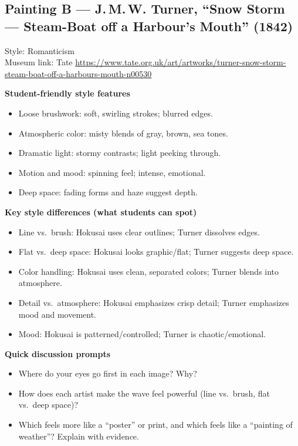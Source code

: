 \documentclass[12pt]{article}
\begin{document}
\subsection*{Painting B — J.\,M.\,W. Turner, ``Snow Storm — Steam-Boat off a Harbour’s Mouth'' (1842)}
Style: Romanticism \\
Museum link: Tate \url{https://www.tate.org.uk/art/artworks/turner-snow-storm-steam-boat-off-a-harbours-mouth-n00530}

\textbf{Student-friendly style features}
\begin{itemize}
  \item Loose brushwork: soft, swirling strokes; blurred edges.
  \item Atmospheric color: misty blends of gray, brown, sea tones.
  \item Dramatic light: stormy contrasts; light peeking through.
  \item Motion and mood: spinning feel; intense, emotional.
  \item Deep space: fading forms and haze suggest depth.
\end{itemize}

\textbf{Key style differences (what students can spot)}
\begin{itemize}
  \item Line vs.\ brush: Hokusai uses clear outlines; Turner dissolves edges.
  \item Flat vs.\ deep space: Hokusai looks graphic/flat; Turner suggests deep space.
  \item Color handling: Hokusai uses clean, separated colors; Turner blends into atmosphere.
  \item Detail vs.\ atmosphere: Hokusai emphasizes crisp detail; Turner emphasizes mood and movement.
  \item Mood: Hokusai is patterned/controlled; Turner is chaotic/emotional.
\end{itemize}

\textbf{Quick discussion prompts}
\begin{itemize}
  \item Where do your eyes go first in each image? Why?
  \item How does each artist make the wave feel powerful (line vs.\ brush, flat vs.\ deep space)?
  \item Which feels more like a ``poster'' or print, and which feels like a ``painting of weather''? Explain with evidence.
\end{itemize}
\end{document}
